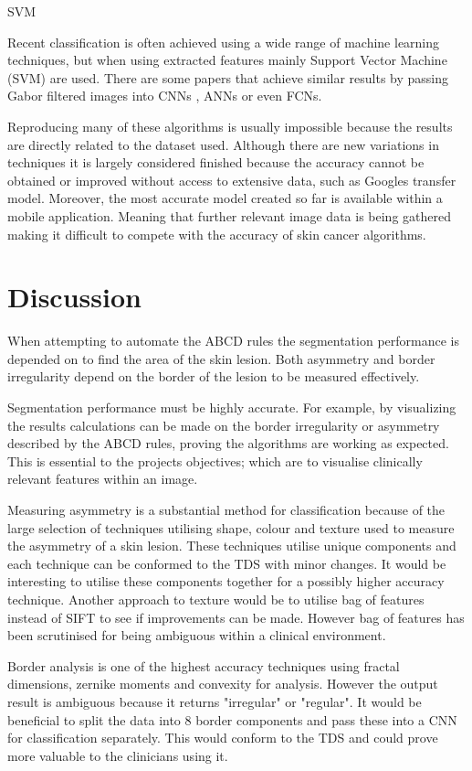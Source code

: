 \documentclass[12pt]{report}
\begin{document}
SVM

Recent classification is often achieved using a wide range of machine learning techniques, but when using extracted features mainly Support Vector Machine (SVM) are used. There are some papers that achieve similar results by passing Gabor filtered images into CNNs \cite{Serte2019, Monisha2018}, ANNs \cite{Majumder2019b} or even FCNs.

Reproducing many of these algorithms is usually impossible because the results are directly related to the dataset used. Although there are new variations in techniques it is largely considered finished because the accuracy cannot be obtained or improved without access to extensive data, such as Googles transfer model. Moreover, the most accurate model created so far \cite{Andre2017} is available within a mobile application. Meaning that further relevant image data is being gathered making it difficult to compete with the accuracy of skin cancer algorithms.

\section{Discussion}

When attempting to automate the ABCD rules the segmentation performance is depended on to find the area of the skin lesion. Both asymmetry and border irregularity depend on the border of the lesion to be measured effectively.

Segmentation performance must be highly accurate. For example, by visualizing the results calculations can be made on the border irregularity or asymmetry described by the ABCD rules, proving the algorithms are working as expected. This is essential to the projects objectives; which are to visualise clinically relevant features within an image.

Measuring asymmetry is a substantial method for classification because of the large selection of techniques utilising shape, colour and texture used to measure the asymmetry of a skin lesion. These techniques utilise unique components and each technique can be conformed to the TDS with minor changes. It would be interesting to utilise these components together for a possibly higher accuracy technique. Another approach to texture would be to utilise bag of features instead of SIFT to see if improvements can be made. However bag of features has been scrutinised for being ambiguous within a clinical environment\cite{}.

Border analysis is one of the highest accuracy techniques using fractal dimensions, zernike moments and convexity for analysis. However the output result is ambiguous because it returns "irregular" or "regular". It would be beneficial to split the data into 8 border components and pass these into a CNN for classification separately. This would conform to the TDS and could prove more valuable to the clinicians using it.
\end{document}
